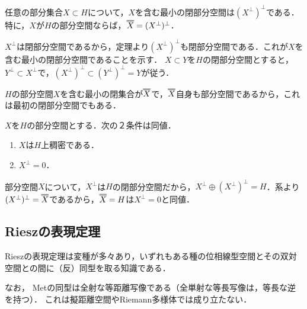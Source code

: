 \documentclass[uplatex,dvipdfmx]{jsreport}
\begin{document}
\begin{corollary}\label{cor-expression-of-closed-linear-span}
    任意の部分集合$X\subset H$について，$X$を含む最小の閉部分空間は$(X^\perp)^\perp$である．
    特に，$X$が$H$の部分空間ならば，$\dbloverline{X}=(X^\perp)^\perp$．
\end{corollary}
\begin{Proof}
    $X^\perp$は閉部分空間であるから，定理より$(X^\perp)^\perp$も閉部分空間である．これが$X$を含む最小の閉部分空間であることを示す．
    $X\subset Y$を$H$の閉部分空間とすると，$Y^\perp\subset X^\perp$で，$(X^\perp)^\perp\subset (Y^\perp)^\perp=Y$が従う．

    $H$の部分空間$X$を含む最小の閉集合が$\dbloverline{X}$で，$\dbloverline{X}$自身も部分空間であるから，これは最初の閉部分空間でもある．
\end{Proof}

\begin{corollary}[部分空間の稠密性の特徴付け]\label{cor-dense-subspace}
    $X$を$H$の部分空間とする．次の２条件は同値．
    \begin{enumerate}
        \item $X$は$H$上稠密である．
        \item $X^\perp=0$．
    \end{enumerate}
\end{corollary}
\begin{Proof}
    部分空間$X$について，$X^\perp$は$H$の閉部分空間だから，$X^\perp\oplus(X^\perp)^\perp=H$．系より$(X^\perp)^\perp=\dbloverline{X}$であるから，$\dbloverline{X}=H$は$X^\perp=0$と同値．
\end{Proof}

\subsection{Rieszの表現定理}

\begin{tcolorbox}[colframe=ForestGreen, colback=ForestGreen!10!white,breakable,colbacktitle=ForestGreen!40!white,coltitle=black,fonttitle=\bfseries\sffamily,
title=]
    Rieszの表現定理は変種が多々あり，いずれもある種の位相線型空間とその双対空間との間に（反）同型を取る知識である．

    なお，
    Metの同型は全射な等距離写像である（全単射な等長写像は，等長な逆を持つ）．
    これは擬距離空間やRiemann多様体では成り立たない．
\end{tcolorbox}
\end{document}
